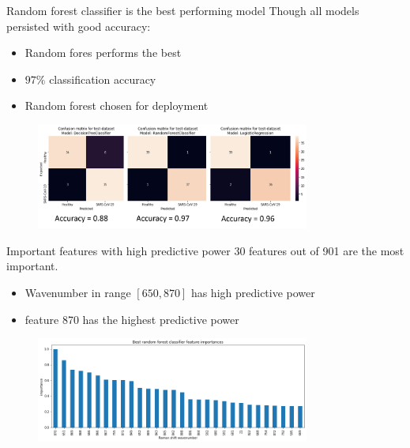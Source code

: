 \begin{frame}{Random forest classifier is the best performing model}
Though all models persisted with good accuracy:
\begin{itemize}
    \item Random fores performs the best
    \item $97\%$ classification accuracy
    \item Random forest chosen for deployment
\end{itemize}
\begin{figure}
		\includegraphics[width=9.0cm]{figures/c_mat.png}
	\end{figure}
\end{frame}

\begin{frame}{Important features with high predictive power}
30 features out of 901 are the most important.
\vspace{0.1cm}
\begin{itemize}
    \item Wavenumber in range $\left[650,870\right]$ has high predictive power
    \item feature 870 has the highest predictive power 
\end{itemize}
\begin{figure}
		\includegraphics[width=9.0cm]{figures/predictive_features.png}
	\end{figure}
\end{frame}

